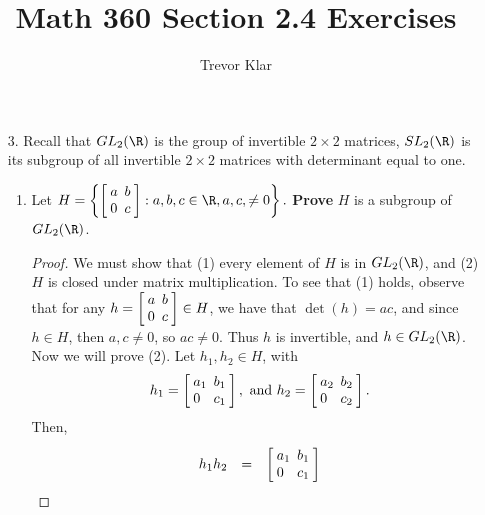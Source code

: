 \documentclass[letterpaper]{article}
\title{Math 360 \linebreak
Section 2.4 Exercises}
\author{Trevor Klar}
\begin{document}

\begin{enumerate}

\item[3.] Recall that $GL_2(\R)$ is the group of invertible $2\times 2$ matrices, $SL_2(\R)$ is its subgroup of all invertible $2\times 2$ matrices with determinant equal to one.
	\begin{enumerate}
	\item Let $H=\left\lbrace
	\arraycolsep=2.4pt\def\arraystretch{1}
	\left[\begin{array}{lr}
	a & b \\
	0 & c \\
	\end{array} \right]
	: a,b,c \in \R, a,c,\neq 0
	\right\rbrace.$
	\textbf{Prove} $H$ is a subgroup of $GL_2(\R)$. 
	\begin{proof}
	We must show that (1) every element of $H$ is in $GL_2(\R)$, and (2) $H$ is closed under matrix multiplication. To see that (1) holds, observe that for any 
	$h=\arraycolsep=2.4pt\def\arraystretch{1}
	\left[\begin{array}{lr}
	a & b \\
	0 & c \\
	\end{array} \right]
	\in H$, we have that $\det(h)=ac$, and since $h\in H$, then $a,c\neq 0$, so $ac\neq 0$. Thus $h$ is invertible, and $h\in GL_2(\R)$. Now we will prove (2). Let $h_1, h_2\in H$, with 
	\[h_1=\arraycolsep=2.4pt\def\arraystretch{1}
	\left[\begin{array}{lr}
	a_1 & b_1 \\
	0 & c_1 \\
	\end{array} \right]
	, \text{ and }
	h_2=\arraycolsep=2.4pt\def\arraystretch{1}
	\left[\begin{array}{lr}
	a_2 & b_2 \\
	0 & c_2 \\
	\end{array} \right].\]
	Then,
	\[\def\arraystretch{2}\begin{array}{rcl}
	h_1h_2 &=& 
	\arraycolsep=2.4pt\def\arraystretch{1}
	\left[\begin{array}{lr}
	a_1 & b_1 \\
	0 & c_1 \\
	\end{array} \right]

\end{array}\]
\end{proof}
\end{enumerate}
\end{enumerate}
\end{document}
